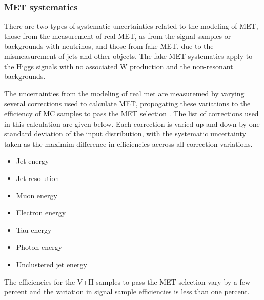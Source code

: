 \subsubsection{MET systematics}\label{sec:metsyst}

There are two types of systematic uncertainties related to the modeling of MET, those from the measurement of real MET, as from the signal samples or backgrounds with neutrinos, and those from fake MET, due to the mismeasurement of jets and other objects. The fake MET systematics apply to the Higgs signals with no associated W production and the non-resonant backgrounds. 

The uncertainties from the modeling of real met are measuremed by varying several corrections used to calculate MET, propogating these variations to the efficiency of MC samples to pass the MET selection \cite{mettwiki}. The list of corrections used in this calculation are given below. Each correction is varied up and down by one standard deviation of the input distribution, with the systematic uncertainty taken as the maximim difference in efficiencies accross all correction variations.

\begin{itemize}
\item Jet energy
\item Jet resolution
\item Muon energy
\item Electron energy
\item Tau energy
\item Photon energy
\item Unclustered jet energy
\end{itemize}

The efficiencies for the V+H samples to pass the MET selection vary by a few percent and the variation in signal sample efficiencies is less than one percent.

